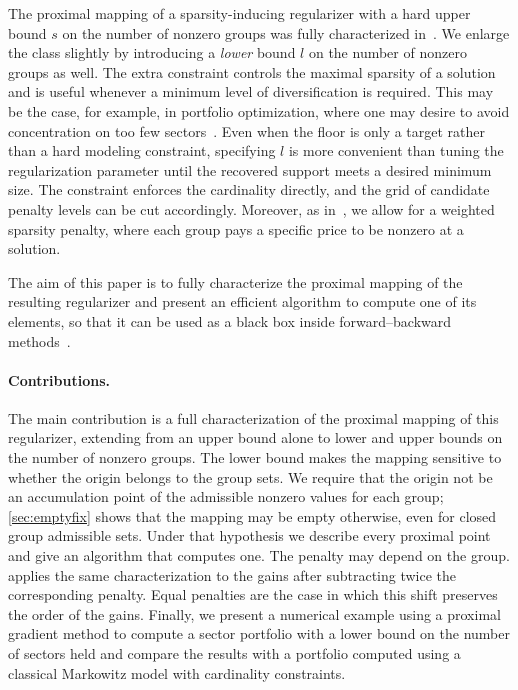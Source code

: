 \documentclass[11pt,a4paper]{article}
\theoremstyle{plain}
\theoremstyle{definition}
\theoremstyle{remark}
\begin{document}
The proximal mapping of a sparsity-inducing regularizer with a hard upper bound \( s \) on the number of nonzero groups was fully characterized in~\cite{beck2018}.
We enlarge the class slightly by introducing a \emph{lower} bound \( l \) on the number of nonzero groups as well.
The extra constraint controls the maximal sparsity of a solution and is useful whenever a minimum level of diversification is required.
This may be the case, for example, in portfolio optimization, where one may desire to avoid concentration on too few sectors~\cite{brodie2009,beck2018}.
Even when the floor is only a target rather than a hard modeling constraint, specifying \(l\) is more convenient than tuning the regularization parameter until the recovered support meets a desired minimum size.
The constraint enforces the cardinality directly, and the grid of candidate penalty levels can be cut accordingly.
Moreover, as in~\cite{}, we allow for a weighted sparsity penalty, where each group pays a specific price to be nonzero at a solution.

The aim of this paper is to fully characterize the proximal mapping of the resulting regularizer and present an efficient algorithm to compute one of its elements, so that it can be used as a black box inside forward--backward methods~\cite{moreau1962,beckbook}.

\paragraph{Contributions.}
The main contribution is a full characterization of the proximal mapping of this regularizer, extending \cite[Theorem~3.2]{beck2018} from an upper bound alone to lower and upper bounds on the number of nonzero groups.
The lower bound makes the mapping sensitive to whether the origin belongs to the group sets.
We require that the origin not be an accumulation point of the admissible nonzero values for each group; \cref{sec:emptyfix} shows that the mapping may be empty otherwise, even for closed group admissible sets.
Under that hypothesis we describe every proximal point and give an algorithm that computes one.
The penalty may depend on the group.
 applies
the same characterization to the gains after subtracting twice the
corresponding penalty.
Equal penalties are the case in which this shift preserves the order of the gains.
Finally, we present a numerical example using a proximal gradient method to compute a sector portfolio with a lower bound on the number of sectors held and compare the results with a portfolio computed using a classical Markowitz model with cardinality constraints.
\end{document}

